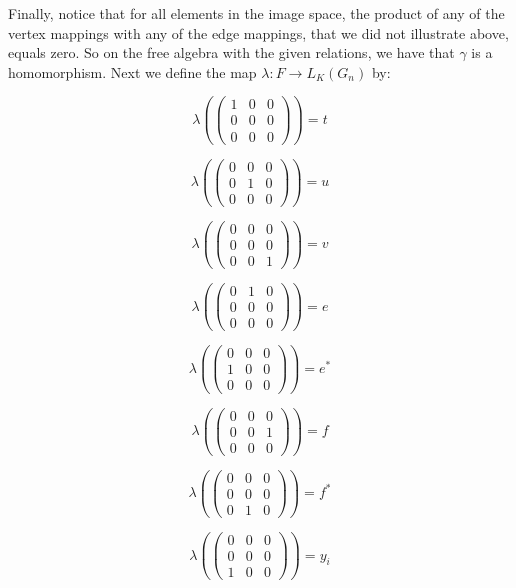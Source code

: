 \begin{solution}
    Finally, notice that for all elements in the image space, the product of any of the vertex mappings
    with any of the edge mappings, that we did not illustrate above, equals zero. So on the free algebra
    with the given relations, we have that $\gamma$ is a homomorphism.
    Next we define the map $\lambda:F\to L_K(G_n)$ by:

    $$\lambda(\left(\begin{array}{ccc} 1 & 0 & 0 \\ 0 & 0 & 0 \\ 0 & 0 & 0 \end{array}\right))=t$$

    $$\lambda(\left(\begin{array}{ccc} 0 & 0 & 0 \\ 0 & 1 & 0 \\ 0 & 0 & 0 \end{array}\right))=u$$

    $$\lambda(\left(\begin{array}{ccc} 0 & 0 & 0 \\ 0 & 0 & 0 \\ 0 & 0 & 1 \end{array}\right))=v$$

    $$\lambda(\left(\begin{array}{ccc} 0 & 1 & 0 \\ 0 & 0 & 0 \\ 0 & 0 & 0 \end{array}\right))=e$$

    $$\lambda(\left(\begin{array}{ccc} 0 & 0 & 0 \\ 1 & 0 & 0 \\ 0 & 0 & 0 \end{array}\right))=e^*$$

    $$\lambda(\left(\begin{array}{ccc} 0 & 0 & 0 \\ 0 & 0 & 1 \\ 0 & 0 & 0 \end{array}\right))=f$$

    $$\lambda(\left(\begin{array}{ccc} 0 & 0 & 0 \\ 0 & 0 & 0 \\ 0 & 1 & 0 \end{array}\right))=f^*$$

    $$\lambda(\left(\begin{array}{ccc} 0 & 0 & 0 \\ 0 & 0 & 0 \\ 1 & 0 & 0 \end{array}\right))=y_i$$


\end{solution}
